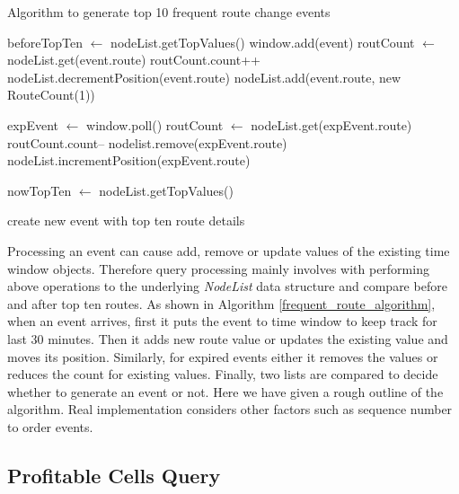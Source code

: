 \begin{algorithm}
\caption{Algorithm to generate top 10 frequent route change events}
\label{frequent_route_algorithm}
\begin{algorithmic} 
\STATE beforeTopTen $\leftarrow$ nodeList.getTopValues() 
\STATE window.add(event) 
	\STATE routCount $\leftarrow$ nodeList.get(event.route) 
	\STATE routCount.count++ 
	\STATE nodeList.decrementPosition(event.route) 
\ELSE
	\STATE nodeList.add(event.route, new RouteCount(1)) 
\ENDIF

	\STATE  expEvent $\leftarrow$ window.poll() 
	\STATE  routCount $\leftarrow$ nodeList.get(expEvent.route)
	\STATE  routCount.count-- 
		\STATE nodelist.remove(expEvent.route)
	\ELSE
		\STATE nodeList.incrementPosition(expEvent.route) 
	\ENDIF
\ENDWHILE

\STATE nowTopTen $\leftarrow$ nodeList.getTopValues() 

	\STATE create new event with top ten route details 
\ENDIF

\end{algorithmic}
\end{algorithm}

Processing an event can cause add, remove or update values of the existing time window objects. Therefore query processing mainly involves with performing above operations to the underlying \textit{NodeList} data structure and compare before and after top ten routes. As shown in Algorithm \ref{frequent_route_algorithm}, when an event arrives, first it puts the event to time window to keep track for last 30 minutes. Then it adds new route value or updates the existing value and moves its position. Similarly, for expired events either it removes the values or reduces the count for existing values. Finally, two lists are compared to decide whether to generate an event or not. Here we have given a rough outline of the algorithm. Real implementation considers other factors such as sequence number to order events.

\subsection{Profitable Cells Query}

